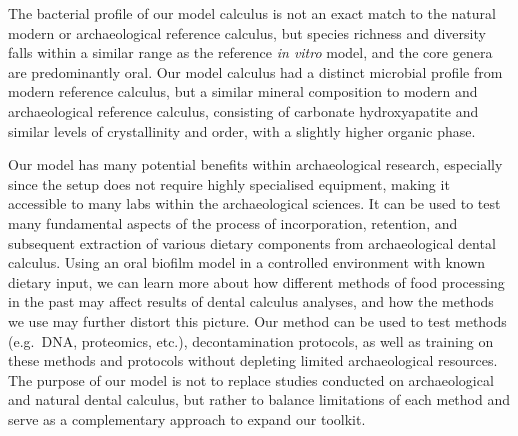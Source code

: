 \documentclass[
  letterpaper,
]{book}
\begin{document}
The bacterial profile of our model calculus is not an exact match to the
natural modern or archaeological reference calculus, but species
richness and diversity falls within a similar range as the reference
\emph{in vitro} model, and the core genera are predominantly oral. Our
model calculus had a distinct microbial profile from modern reference
calculus, but a similar mineral composition to modern and archaeological
reference calculus, consisting of carbonate hydroxyapatite and similar
levels of crystallinity and order, with a slightly higher organic phase.

Our model has many potential benefits within archaeological research,
especially since the setup does not require highly specialised
equipment, making it accessible to many labs within the archaeological
sciences. It can be used to test many fundamental aspects of the process
of incorporation, retention, and subsequent extraction of various
dietary components from archaeological dental calculus. Using an oral
biofilm model in a controlled environment with known dietary input, we
can learn more about how different methods of food processing in the
past may affect results of dental calculus analyses, and how the methods
we use may further distort this picture. Our method can be used to test
methods (e.g.~DNA, proteomics, etc.), decontamination protocols, as well
as training on these methods and protocols without depleting limited
archaeological resources. The purpose of our model is not to replace
studies conducted on archaeological and natural dental calculus, but
rather to balance limitations of each method and serve as a
complementary approach to expand our toolkit.
\end{document}
